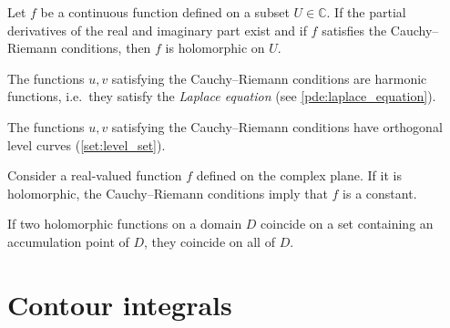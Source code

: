     \begin{theorem}
        Let $f$ be a continuous function defined on a subset $U\in\mathbb{C}$. If the partial derivatives of the real and imaginary part exist and if $f$ satisfies the Cauchy--Riemann conditions, then $f$ is holomorphic on $U$.
    \end{theorem}

    \begin{property}
        The functions $u,v$ satisfying the Cauchy--Riemann conditions are harmonic functions, i.e.~they satisfy the \textit{Laplace equation} (see \cref{pde:laplace_equation}).
    \end{property}
    \begin{property}
        The functions $u,v$ satisfying the Cauchy--Riemann conditions have orthogonal level curves (\cref{set:level_set}).
    \end{property}

    \begin{property}
        Consider a real-valued function $f$ defined on the complex plane. If it is holomorphic, the Cauchy--Riemann conditions imply that $f$ is a constant.
    \end{property}

    \begin{theorem}
        If two holomorphic functions on a domain $D$ coincide on a set containing an accumulation point of $D$, they coincide on all of $D$.
    \end{theorem}

\section{Contour integrals}




